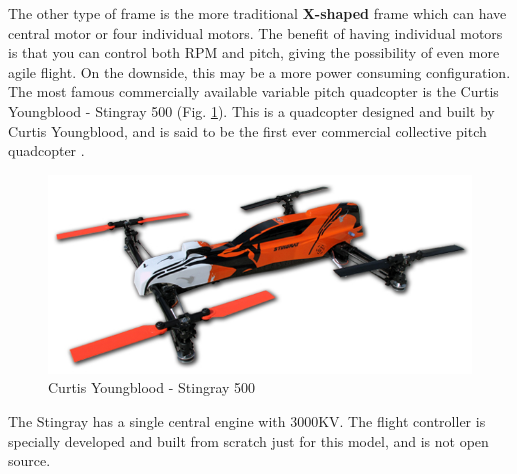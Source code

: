 The other type of frame is the more traditional \textbf{X-shaped} frame which can have central motor or four individual motors. The benefit of having individual motors is that you can control both RPM and pitch, giving the possibility of even more agile flight. On the downside, this may be a more power consuming configuration. \\

The most famous commercially available variable pitch quadcopter is the Curtis Youngblood - Stingray 500 (Fig. \ref{fig:stingray}). This is a quadcopter designed and built by Curtis Youngblood, and is said to be the first ever commercial collective pitch quadcopter \cite{curtis}.  

\begin{figure}[h]
\centering
    \includegraphics[scale = 1]{VAPIQ-PICTURES/stingray}
    \caption{Curtis Youngblood - Stingray 500}
    \label{fig:stingray}    
\end{figure}

The Stingray has a single central engine with 3000KV. The flight controller is specially developed and built from scratch just for this model, and is not open source.

 

